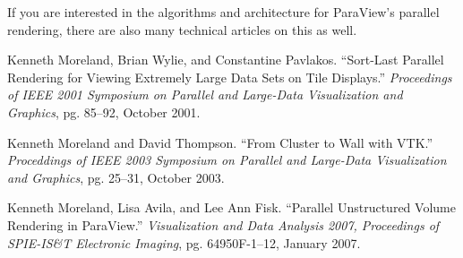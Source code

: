 If you are interested in the algorithms and architecture for ParaView's
parallel rendering, there are also many technical articles on this as well.

\begin{reflist}
\item Kenneth Moreland, Brian Wylie, and Constantine Pavlakos.  ``Sort-Last
  Parallel Rendering for Viewing Extremely Large Data Sets on Tile
  Displays.''  \emph{Proceedings of IEEE 2001 Symposium on Parallel and
    Large-Data Visualization and Graphics}, pg. 85–92, October 2001.
\item Kenneth Moreland and David Thompson.  ``From Cluster to Wall with
  VTK.''  \emph{Proceddings of IEEE 2003 Symposium on Parallel and
    Large-Data Visualization and Graphics}, pg. 25–31, October 2003.
\item Kenneth Moreland, Lisa Avila, and Lee Ann Fisk.  ``Parallel
  Unstructured Volume Rendering in ParaView.''  \emph{Visualization and Data
  Analysis 2007, Proceedings of SPIE-IS\&T Electronic Imaging},
  pg. 64950F-1–12, January 2007.
\end{reflist}


